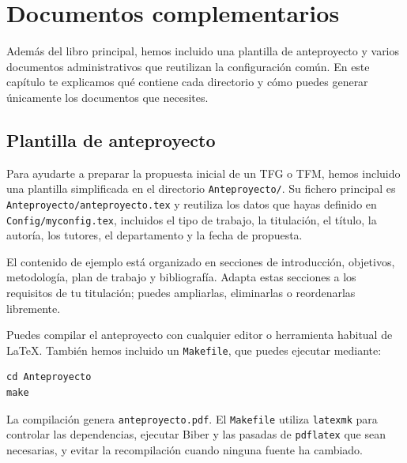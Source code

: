 %

\chapter{Documentos complementarios}
\label{cha:documentos-complementarios}

Además del libro principal, hemos incluido una plantilla de anteproyecto y varios documentos administrativos que reutilizan la configuración común. En este capítulo te explicamos qué contiene cada directorio y cómo puedes generar únicamente los documentos que necesites.

\section{Plantilla de anteproyecto}
\label{sec:plantilla-de-anteproyecto}

Para ayudarte a preparar la propuesta inicial de un TFG o TFM, hemos incluido una plantilla simplificada en el directorio \texttt{Anteproyecto/}. Su fichero principal es \texttt{Anteproyecto/anteproyecto.tex} y reutiliza los datos que hayas definido en \texttt{Config/myconfig.tex}, incluidos el tipo de trabajo, la titulación, el título, la autoría, los tutores, el departamento y la fecha de propuesta.

El contenido de ejemplo está organizado en secciones de introducción, objetivos, metodología, plan de trabajo y bibliografía. Adapta estas secciones a los requisitos de tu titulación; puedes ampliarlas, eliminarlas o reordenarlas libremente.

Puedes compilar el anteproyecto con cualquier editor o herramienta habitual de \LaTeX{}. También hemos incluido un \texttt{Makefile}, que puedes ejecutar mediante:

\begin{verbatim}
cd Anteproyecto
make
\end{verbatim}

La compilación genera \texttt{anteproyecto.pdf}. El \texttt{Makefile} utiliza \texttt{latexmk} para controlar las dependencias, ejecutar Biber y las pasadas de \texttt{pdflatex} que sean necesarias, y evitar la recompilación cuando ninguna fuente ha cambiado.

